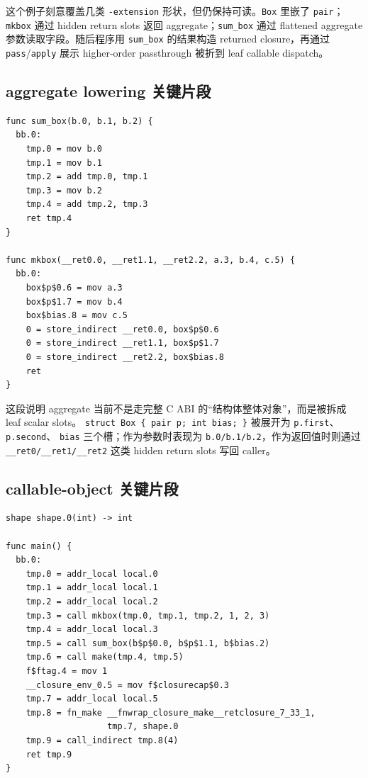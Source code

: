 \documentclass[UTF8,a4paper,11pt]{ctexart}
\begin{document}
这个例子刻意覆盖几类 \texttt{-extension} 形状，但仍保持可读。\texttt{Box} 里嵌了
\texttt{pair}；\texttt{mkbox} 通过 hidden return slots 返回 aggregate；\texttt{sum\_box}
通过 flattened aggregate 参数读取字段。随后程序用 \texttt{sum\_box} 的结果构造 returned
closure，再通过 \texttt{pass}/\texttt{apply} 展示 higher-order passthrough 被折到 leaf
callable dispatch。

\subsection{aggregate lowering 关键片段}

\begin{lstlisting}[language={}]
func sum_box(b.0, b.1, b.2) {
  bb.0:
    tmp.0 = mov b.0
    tmp.1 = mov b.1
    tmp.2 = add tmp.0, tmp.1
    tmp.3 = mov b.2
    tmp.4 = add tmp.2, tmp.3
    ret tmp.4
}

func mkbox(__ret0.0, __ret1.1, __ret2.2, a.3, b.4, c.5) {
  bb.0:
    box$p$0.6 = mov a.3
    box$p$1.7 = mov b.4
    box$bias.8 = mov c.5
    0 = store_indirect __ret0.0, box$p$0.6
    0 = store_indirect __ret1.1, box$p$1.7
    0 = store_indirect __ret2.2, box$bias.8
    ret
}
\end{lstlisting}

这段说明 aggregate 当前不是走完整 C ABI 的“结构体整体对象”，而是被拆成 leaf scalar slots。
\texttt{struct Box \{ pair p; int bias; \}} 被展开为 \texttt{p.first}、\texttt{p.second}、
\texttt{bias} 三个槽；作为参数时表现为 \texttt{b.0/b.1/b.2}，作为返回值时则通过
\texttt{\_\_ret0/\_\_ret1/\_\_ret2} 这类 hidden return slots 写回 caller。

\subsection{callable-object 关键片段}

\begin{lstlisting}[language={}]
shape shape.0(int) -> int

func main() {
  bb.0:
    tmp.0 = addr_local local.0
    tmp.1 = addr_local local.1
    tmp.2 = addr_local local.2
    tmp.3 = call mkbox(tmp.0, tmp.1, tmp.2, 1, 2, 3)
    tmp.4 = addr_local local.3
    tmp.5 = call sum_box(b$p$0.0, b$p$1.1, b$bias.2)
    tmp.6 = call make(tmp.4, tmp.5)
    f$ftag.4 = mov 1
    __closure_env_0.5 = mov f$closurecap$0.3
    tmp.7 = addr_local local.5
    tmp.8 = fn_make __fnwrap_closure_make__retclosure_7_33_1,
                    tmp.7, shape.0
    tmp.9 = call_indirect tmp.8(4)
    ret tmp.9
}
\end{lstlisting}
\end{document}
